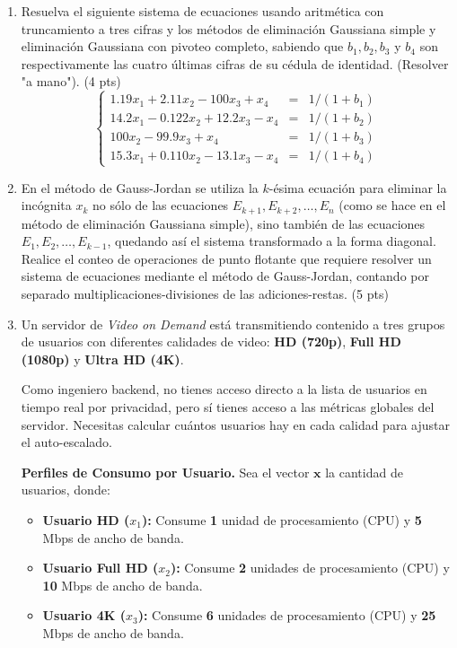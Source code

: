 \documentclass[12pt, letterpaper]{article}
\begin{document}
\begin{enumerate}
    \item Resuelva el siguiente sistema de ecuaciones usando aritmética con truncamiento a tres cifras y los métodos de eliminación Gaussiana simple y eliminación Gaussiana con pivoteo completo, sabiendo que $b_1, b_2, b_3$ y $b_4$ son respectivamente las cuatro últimas cifras de su cédula de identidad. (Resolver "a mano"). (4 pts)
    $$
    \left\{
    \begin{array}{rcl}
        1.19x_1 + 2.11x_2 - 100x_3 + x_4 & = & 1/(1+b_1) \\
        14.2x_1 - 0.122x_2 + 12.2x_3 - x_4 & = & 1/(1+b_2) \\
        100x_2 - 99.9x_3 + x_4 & = & 1/(1+b_3) \\
        15.3x_1 + 0.110x_2 - 13.1x_3 - x_4 & = & 1/(1+b_4)
    \end{array}
    \right.
    $$        
    
    \item En el método de Gauss-Jordan se utiliza la $k$-ésima ecuación para eliminar la incógnita $x_k$ no sólo de las ecuaciones $E_{k+1}, E_{k+2}, \dots, E_n$ (como se hace en el método de eliminación Gaussiana simple), sino también de las ecuaciones $E_1, E_2, \dots, E_{k-1}$, quedando así el sistema transformado a la forma diagonal. Realice el conteo de operaciones de punto flotante que requiere resolver un sistema de ecuaciones mediante el método de Gauss-Jordan, contando por separado multiplicaciones-divisiones de las adiciones-restas. (5 pts)
    
    \item Un servidor de \textit{Video on Demand} está transmitiendo contenido a tres grupos de usuarios con diferentes calidades de video: \textbf{HD (720p)}, \textbf{Full HD (1080p)} y \textbf{Ultra HD (4K)}.

Como ingeniero backend, no tienes acceso directo a la lista de usuarios en tiempo real por privacidad, pero sí tienes acceso a las métricas globales del servidor. Necesitas calcular cuántos usuarios hay en cada calidad para ajustar el auto-escalado.

\textbf{Perfiles de Consumo por Usuario.} Sea el vector $\mathbf{x}$ la cantidad de usuarios, donde:
\begin{itemize}
    \item \textbf{Usuario HD ($x_1$):} Consume \textbf{1} unidad de procesamiento (CPU) y \textbf{5} Mbps de ancho de banda.
    \item \textbf{Usuario Full HD ($x_2$):} Consume \textbf{2} unidades de procesamiento (CPU) y \textbf{10} Mbps de ancho de banda.
    \item \textbf{Usuario 4K ($x_3$):} Consume \textbf{6} unidades de procesamiento (CPU) y \textbf{25} Mbps de ancho de banda.
\end{itemize}


\end{enumerate}
\end{document}
